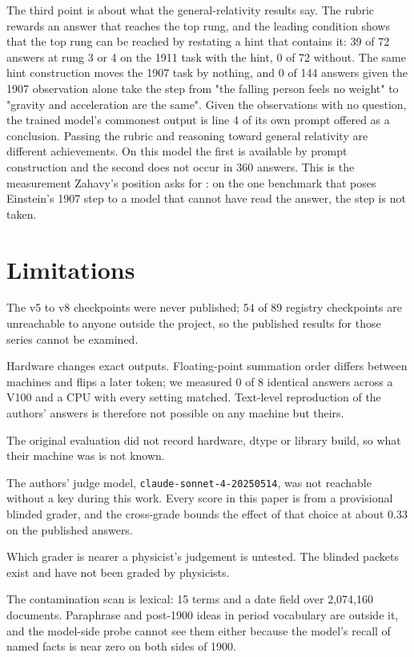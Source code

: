\documentclass[reprint,prx,amsmath,amssymb,aps,superscriptaddress]{revtex4-2}
\begin{document}
The third point is about what the general-relativity results say. The rubric rewards an answer that reaches the top rung, and the leading condition shows that the top rung can be reached by restating a hint that contains it: 39 of 72 answers at rung 3 or 4 on the 1911 task with the hint, 0 of 72 without. The same hint construction moves the 1907 task by nothing, and 0 of 144 answers given the 1907 observation alone take the step from "the falling person feels no weight" to "gravity and acceleration are the same". Given the observations with no question, the trained model's commonest output is line 4 of its own prompt offered as a conclusion. Passing the rubric and reasoning toward general relativity are different achievements. On this model the first is available by prompt construction and the second does not occur in 360 answers. This is the measurement Zahavy's position asks for \cite{ref2}: on the one benchmark that poses Einstein's 1907 step to a model that cannot have read the answer, the step is not taken.

\section{Limitations}

The v5 to v8 checkpoints were never published; 54 of 89 registry checkpoints are unreachable to anyone outside the project, so the published results for those series cannot be examined.

Hardware changes exact outputs. Floating-point summation order differs between machines and flips a later token; we measured 0 of 8 identical answers across a V100 and a CPU with every setting matched. Text-level reproduction of the authors' answers is therefore not possible on any machine but theirs.

The original evaluation did not record hardware, dtype or library build, so what their machine was is not known.

The authors' judge model, \texttt{claude-sonnet-4-20250514}, was not reachable without a key during this work. Every score in this paper is from a provisional blinded grader, and the cross-grade bounds the effect of that choice at about 0.33 on the published answers.

Which grader is nearer a physicist's judgement is untested. The blinded packets exist and have not been graded by physicists.

The contamination scan is lexical: 15 terms and a date field over 2,074,160 documents. Paraphrase and post-1900 ideas in period vocabulary are outside it, and the model-side probe cannot see them either because the model's recall of named facts is near zero on both sides of 1900.
\end{document}

